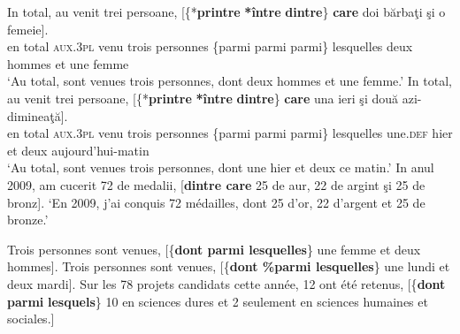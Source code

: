 \ea \label{ch3:ex64}
\ea 
\gll In  total,  au  venit  trei  persoane,  [\{*\textbf{printre}  {\textbar}  \textbf{*între}  {\textbar}  \textbf{dintre}\} \textbf{care} doi  bărbaţi  şi  o  femeie]. \label{ch3:ex64a}\\
en  total  \textsc{aux.3pl}  venu  trois  personnes  \{parmi  {\textbar}  parmi  {\textbar}  parmi\}  lesquelles deux  hommes  et  une  femme \\
\glt ‘Au total, sont venues trois personnes, dont deux hommes et une femme.’
\ex  
\gll In total,  au  venit  trei  persoane,  [\{*\textbf{printre}  {\textbar}  \textbf{*între}  {\textbar}  \textbf{dintre}\} \textbf{care} una  ieri  şi  două  azi-dimineaţă]. \label{ch3:ex64b}\\
en  total  \textsc{aux.3pl}  venu  trois  personnes  \{parmi  {\textbar}  parmi  {\textbar}  parmi\}  lesquelles une.\textsc{def}  hier  et  deux  aujourd’hui-matin \\
\glt ‘Au total, sont venues trois personnes, dont une hier et deux ce matin.’
\ex 
In anul 2009, am cucerit 72 de medalii, [\textbf{dintre care} 25 de aur, 22 de argint şi 25 de bronz]. \label{ch3:ex64c}
\glt ‘En 2009, j’ai conquis 72 médailles, dont 25 d’or, 22 d’argent et 25 de bronze.’ 
\z 
\z 

\ea \label{ch3:ex65}
\ea 
Trois personnes sont venues, [\{\textbf{dont {\textbar} parmi lesquelles}\} une femme et deux hommes]. \label{ch3:ex65a}
\ex
Trois personnes sont venues, [\{\textbf{dont {\textbar} \%parmi lesquelles}\} une lundi et deux mardi]. \label{ch3:ex65b}
\ex
Sur les 78 projets candidats cette année, 12 ont été retenus, [\{\textbf{dont} {\textbar} \textbf{parmi} \textbf{lesquels}\} 10 en sciences dures et 2 seulement en sciences humaines et sociales.] \label{ch3:ex65c}
\z 
\z 


